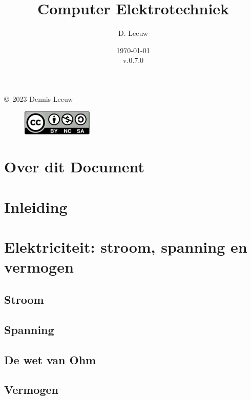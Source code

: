 \documentclass[a4paper,12pt,twoside,openright,titlepage]{book}
\author{D. Leeuw}
\title{Computer Elektrotechniek}
\date{\today\\v.0.7.0}
\begin{document}

\maketitle

\copyright\ 2023 Dennis Leeuw\\

\begin{figure}
\includegraphics[width=0.3\textwidth]{CC-BY-SA-NC.png}
\end{figure}

\bigskip




\frontmatter
\chapter{Over dit Document}



\tableofcontents

\mainmatter
\chapter{Inleiding}


\chapter{Elektriciteit: stroom, spanning en vermogen}

\section{Stroom}

\section{Spanning}

\section{De wet van Ohm}

\section{Vermogen}

\end{document}
